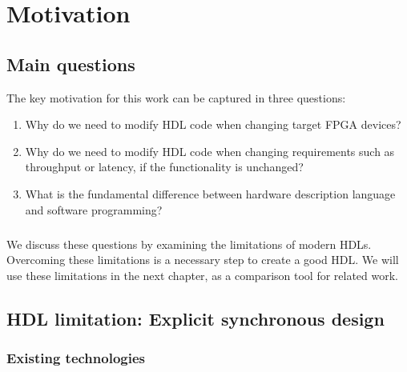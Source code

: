 \chapter{Motivation}
\label{chap:motivation}

\section{Main questions}
The key motivation for this work can be captured in three questions: 
\begin{enumerate}
\item Why do we need to modify HDL code when changing target FPGA devices? 
\item Why do we need to modify HDL code when changing requirements such as throughput or latency, if the functionality is unchanged? 
\item What is the fundamental difference between hardware description language and software programming? 
\end{enumerate}


\paragraph{}We discuss these questions by examining the limitations of modern HDLs. Overcoming these limitations is a necessary step to create a good HDL. We will use these limitations in the next chapter, as a comparison tool for related work.


\section{HDL limitation: Explicit synchronous design}
\label{sec:limitation synchronous}
\subsection*{Existing technologies}
